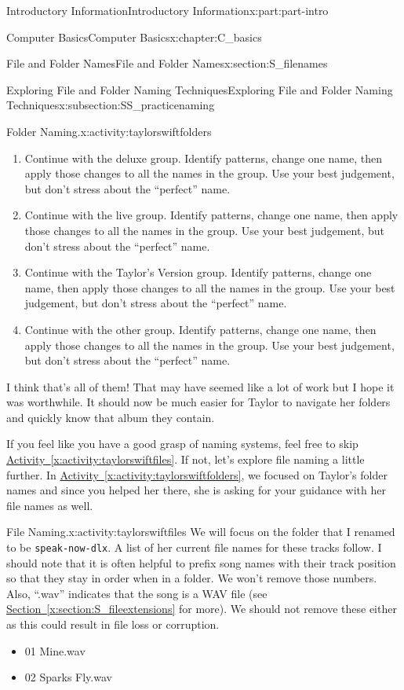 \documentclass[oneside,10pt,]{book}
\newcommand{\xreffont}{\relax}
\newcommand{\mono}[1]{\texttt{#1}}
\begin{document}
\begin{partptx}{Introductory Information}{}{Introductory Information}{}{}{x:part:part-intro}
\begin{chapterptx}{Computer Basics}{}{Computer Basics}{}{}{x:chapter:C_basics}
\begin{sectionptx}{File and Folder Names}{}{File and Folder Names}{}{}{x:section:S_filenames}
\begin{subsectionptx}{Exploring File and Folder Naming Techniques}{}{Exploring File and Folder Naming Techniques}{}{}{x:subsection:SS_practicenaming}
\begin{activity}{Folder Naming.}{x:activity:taylorswiftfolders}
\begin{enumerate}[font=\bfseries,label=(\alph*),ref=\alph*]
\item{}Continue with the deluxe group. Identify patterns, change one name, then apply those changes to all the names in the group. Use your best judgement, but don't stress about the ``perfect'' name.%
\item{}Continue with the live group. Identify patterns, change one name, then apply those changes to all the names in the group. Use your best judgement, but don't stress about the ``perfect'' name.%
\item{}Continue with the Taylor's Version group. Identify patterns, change one name, then apply those changes to all the names in the group. Use your best judgement, but don't stress about the ``perfect'' name.%
\item{}Continue with the other group. Identify patterns, change one name, then apply those changes to all the names in the group. Use your best judgement, but don't stress about the ``perfect'' name.%
\end{enumerate}
I think that's all of them! That may have seemed like a lot of work but I hope it was worthwhile. It should now be much easier for Taylor to navigate her folders and quickly know that album they contain.%
\end{activity}%
If you feel like you have a good grasp of naming systems, feel free to skip \hyperref[x:activity:taylorswiftfiles]{Activity~{\xreffont\ref{x:activity:taylorswiftfiles}}}. If not, let's explore file naming a little further. In \hyperref[x:activity:taylorswiftfolders]{Activity~{\xreffont\ref{x:activity:taylorswiftfolders}}}, we focused on Taylor's folder names and since you helped her there, she is asking for your guidance with her file names as well.%
\begin{activity}{File Naming.}{x:activity:taylorswiftfiles}%
%
We will focus on the folder that I renamed to be \mono{speak-now-dlx}. A list of her current file names for these tracks follow. I should note that it is often helpful to prefix song names with their track position so that they stay in order when in a folder. We won't remove those numbers. Also, ``.wav'' indicates that the song is a WAV file (see \hyperref[x:section:S_fileextensions]{Section~{\xreffont\ref{x:section:S_fileextensions}}} for more). We should not remove these either as this could result in file loss or corruption.%
\begin{multicols}{2}
\begin{itemize}[label=\textbullet]
\item{}01 Mine.wav%
\item{}02 Sparks Fly.wav%

\end{itemize}
\end{multicols}
\end{activity}
\end{subsectionptx}
\end{sectionptx}
\end{chapterptx}
\end{partptx}
\end{document}
